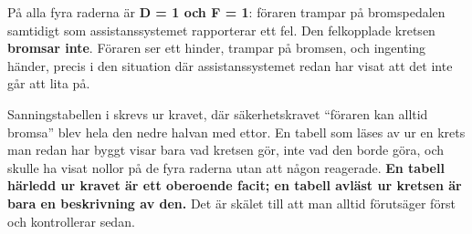 På alla fyra raderna är \textbf{D = 1 och F = 1}: föraren trampar på bromspedalen samtidigt
som assistanssystemet rapporterar ett fel. Den felkopplade kretsen \textbf{bromsar inte}. Föraren
ser ett hinder, trampar på bromsen, och ingenting händer, precis i den situation där
assistanssystemet redan har visat att det inte går att lita på.

Sanningstabellen i  skrevs ur kravet, där säkerhetskravet \enquote{föraren kan
alltid bromsa} blev hela den nedre halvan med ettor. En tabell som läses av ur en krets man redan
har byggt visar bara vad kretsen gör, inte vad den borde göra, och skulle ha visat nollor på de fyra
raderna utan att någon reagerade. \textbf{En tabell härledd ur kravet är ett oberoende facit; en
tabell avläst ur kretsen är bara en beskrivning av den.} Det är skälet till att man alltid
förutsäger först och kontrollerar sedan.

